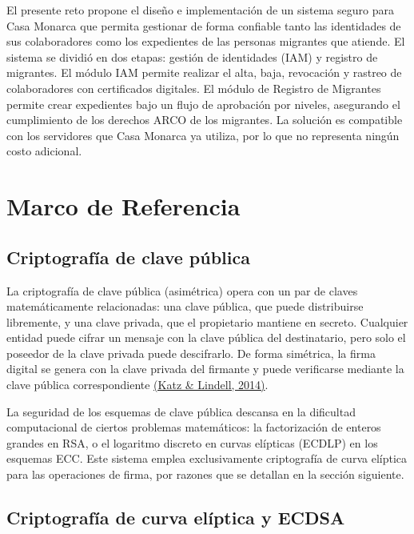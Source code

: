 \documentclass[10pt,letterpaper]{report}
\newcommand{\citeref}[2]{\hyperlink{ref:#1}{(#2)}}
\begin{document}
El presente reto propone el diseño e implementación de un sistema seguro para Casa Monarca que permita gestionar de forma confiable tanto las identidades de sus colaboradores como los expedientes de las personas migrantes que atiende. El sistema se dividió en dos etapas: gestión de identidades (IAM) y registro de migrantes. El módulo IAM permite realizar el alta, baja, revocación y rastreo de colaboradores con certificados digitales. El módulo de Registro de Migrantes permite crear expedientes bajo un flujo de aprobación por niveles, asegurando el cumplimiento de los derechos ARCO de los migrantes. La solución es compatible con los servidores que Casa Monarca ya utiliza, por lo que no representa ningún costo adicional.

\chapter{Marco de Referencia}

\section{Criptografía de clave pública}

La criptografía de clave pública (asimétrica) opera con un par de claves matemáticamente relacionadas: una clave pública, que puede distribuirse libremente, y una clave privada, que el propietario mantiene en secreto. Cualquier entidad puede cifrar un mensaje con la clave pública del destinatario, pero solo el poseedor de la clave privada puede descifrarlo. De forma simétrica, la firma digital se genera con la clave privada del firmante y puede verificarse mediante la clave pública correspondiente \citeref{katz2014}{Katz \& Lindell, 2014}.

La seguridad de los esquemas de clave pública descansa en la dificultad computacional de ciertos problemas matemáticos: la factorización de enteros grandes en RSA, o el logaritmo discreto en curvas elípticas (ECDLP) en los esquemas ECC. Este sistema emplea exclusivamente criptografía de curva elíptica para las operaciones de firma, por razones que se detallan en la sección siguiente.

\section{Criptografía de curva elíptica y ECDSA}
\end{document}
